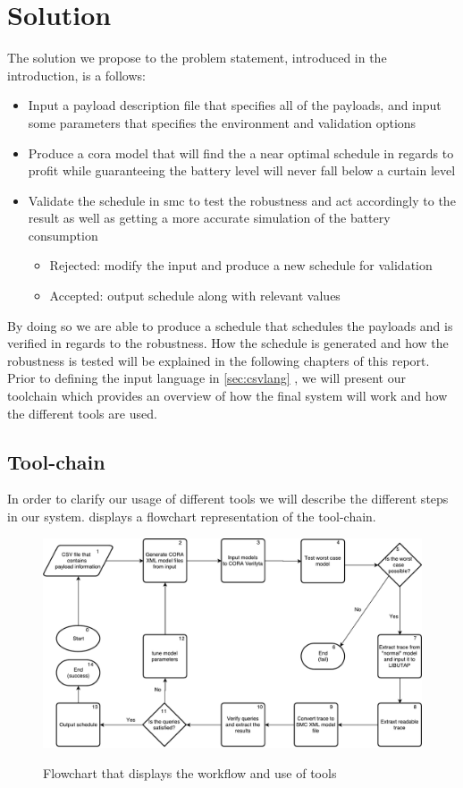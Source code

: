 \section{Solution} \label{sec:solution}
The solution we propose to the problem statement, introduced in the introduction, is a follows:
\begin{itemize}
	\item	Input a payload description file that specifies all of the payloads, and input some parameters that specifies the environment and validation options
	\item	Produce a \gls{cora} model that will find the a near optimal schedule in regards to profit while guaranteeing the battery level will never fall below a curtain level
	\item	Validate the schedule in \gls{smc} to test the robustness and act accordingly to the result as well as getting a more accurate simulation of the battery consumption
	\begin{itemize}
		\item	Rejected: modify the input and produce a new schedule for validation
		\item	Accepted: output schedule along with relevant values
	\end{itemize}
\end{itemize}

By doing so we are able to produce a schedule that schedules the payloads and is verified in regards to the robustness.
How the schedule is generated and how the robustness is tested will be explained in the following chapters of this report.
Prior to defining the input language in \cref{sec:csvlang} , we will present our toolchain which provides an overview of how the final system will work and how the different tools are used.

\subsection{Tool-chain} \label{subsec:tool_chainv}
In order to clarify our usage of different tools we will describe the different steps in our system. 
 displays a flowchart representation of the tool-chain.

\begin{figure}[h]
	\includegraphics[width=\textwidth]{graphics/tool_chain.pdf}
	\label{fig:tool1}
	\caption{Flowchart that displays the workflow and use of tools}
\end{figure}

